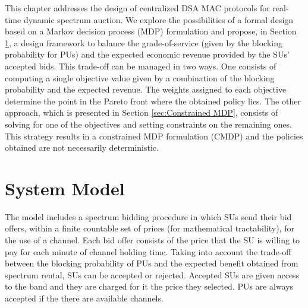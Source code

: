 This chapter addresses the design of centralized DSA MAC protocols for real-time dynamic spectrum auction. We explore the possibilities of a formal design based on a Markov decision process (MDP) formulation and propose, in Section \ref{Sarnoff_sec_model}, a design framework to balance the grade-of-service (given by the blocking probability for PUs) and the expected economic revenue provided by the SUs' accepted bids. This trade-off can be managed in two ways. One consists of computing a single objective value given by a combination of the blocking probability and the expected revenue. The weights assigned to each objective determine the point in the Pareto front where the obtained policy lies. The other approach, which is presented in Section \ref{sec:Constrained MDP}, consists of solving for one of the objectives and setting constraints on the remaining ones.
This strategy results in a constrained MDP formulation (CMDP) and the policies obtained are not necessarily deterministic.

\section{System Model}\label{Sarnoff_sec_model}

The model includes a spectrum bidding procedure in which SUs send their bid offers, within a finite countable set of prices (for mathematical tractability), for the use of a channel. Each bid offer consists of the price that the SU is willing to pay for each minute of channel holding time. Taking into account the trade-off between the blocking probability of PUs and the expected benefit obtained from spectrum rental, SUs can be accepted or rejected. Accepted SUs are given access to the band and they are charged for it the price they selected. PUs are always accepted if the there are available channels.

